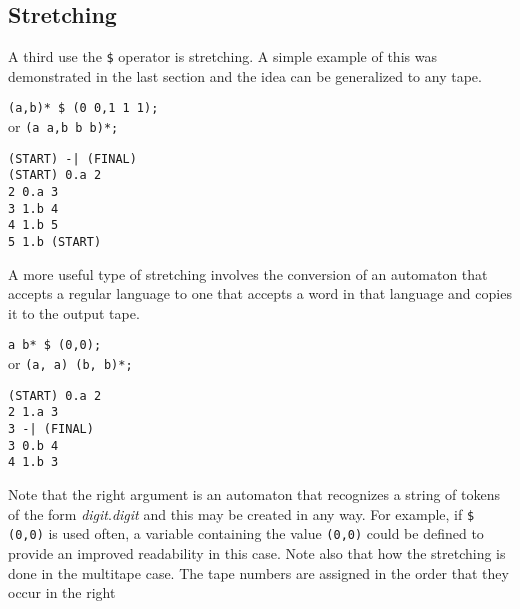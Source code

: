 \subsection{Stretching}
A third use the \verb#$# operator is stretching.
A simple example of this was demonstrated in the last section and the idea
can be generalized to any tape.
\begin{center}\begin{minipage}[t]{3in}\begin{minipage}[t]{3in}\begin{tabbing}
\qquad \= \verb#(a,b)* $ (0 0,1 1 1);#\\
or \> \verb#(a a,b b b)*;#
\end{tabbing}\end{minipage}\end{minipage}
\begin{minipage}[t]{1.6in}\begin{verbatim}
(START) -| (FINAL)
(START) 0.a 2
2 0.a 3
3 1.b 4
4 1.b 5
5 1.b (START)
\end{verbatim}\end{minipage}\end{center}
A more useful type of stretching involves the conversion of an automaton
that accepts a regular language to one that accepts a word in that language
and copies it to the output tape.
\begin{center}\begin{minipage}[t]{3in}\begin{minipage}[t]{3in}\begin{tabbing}
\qquad \= \verb#a b* $ (0,0);#\\
or \> \verb#(a, a) (b, b)*;#
\end{tabbing}\end{minipage}\end{minipage}
\begin{minipage}[t]{1.6in}\begin{verbatim}
(START) 0.a 2
2 1.a 3
3 -| (FINAL)
3 0.b 4
4 1.b 3
\end{verbatim}\end{minipage}\end{center}
Note that the right argument is an automaton that recognizes a string of
tokens of the form {\em digit}.{\em digit} and this may be created in any
way.
For example, if \verb#$ (0,0)# is used often, a variable containing the
value \verb#(0,0)# could be defined to provide an improved readability in
this case.
Note also that how the stretching is done in the multitape case.
The tape numbers are assigned in the order that they occur in the right
